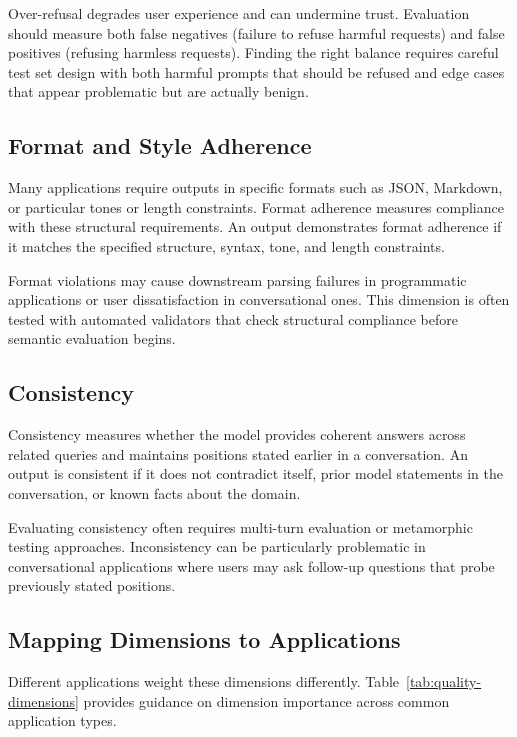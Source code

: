 Over-refusal degrades user experience and can undermine trust. Evaluation should measure both false negatives (failure to refuse harmful requests) and false positives (refusing harmless requests). Finding the right balance requires careful test set design with both harmful prompts that should be refused and edge cases that appear problematic but are actually benign.

\subsection{Format and Style Adherence}

Many applications require outputs in specific formats such as JSON, Markdown, or particular tones or length constraints. Format adherence measures compliance with these structural requirements. An output demonstrates format adherence if it matches the specified structure, syntax, tone, and length constraints.

Format violations may cause downstream parsing failures in programmatic applications or user dissatisfaction in conversational ones. This dimension is often tested with automated validators that check structural compliance before semantic evaluation begins.

\subsection{Consistency}

Consistency measures whether the model provides coherent answers across related queries and maintains positions stated earlier in a conversation. An output is consistent if it does not contradict itself, prior model statements in the conversation, or known facts about the domain.

Evaluating consistency often requires multi-turn evaluation or metamorphic testing approaches. Inconsistency can be particularly problematic in conversational applications where users may ask follow-up questions that probe previously stated positions.

\subsection{Mapping Dimensions to Applications}

Different applications weight these dimensions differently. Table~\ref{tab:quality-dimensions} provides guidance on dimension importance across common application types.

